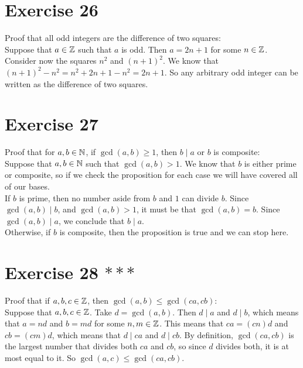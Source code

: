 \documentclass[12pt]{article}
\begin{document}
    \section*{Exercise 26}
    Proof that all odd integers are the difference of two squares: \\
    Suppose that $a \in \mathbb{Z}$
    such that $a$ is odd.
    Then $a = 2n+1$ for some $n \in \mathbb{Z}$.
    Consider now the squares $n^2$ and $(n+1)^2$.
    We know that $(n+1)^2 - n^2 = n^2 + 2n + 1 - n^2 = 2n+1$.
    So any arbitrary odd integer can be written
    as the difference of two squares. \\

    \section*{Exercise 27}
    Proof that for $a, b \in \mathbb{N}$,
    if $\gcd(a, b) \geqslant 1$,
    then $b \mid a$ or $b$ is composite: \\
    Suppose that $a, b \in \mathbb{N}$
    such that $\gcd(a, b) > 1$.
    We know that $b$ is either prime or composite,
    so if we check the proposition for each case
    we will have covered all of our bases. \\
    If $b$ is prime,
    then no number aside from $b$ and $1$ can divide $b$.
    Since $\gcd(a, b) \mid b$,
    and $\gcd(a, b) > 1$,
    it must be that $\gcd(a, b) = b$.
    Since $\gcd(a, b) \mid a$,
    we conclude that $b \mid a$. \\
    Otherwise, if $b$ is composite,
    then the proposition is true and we can stop here. \\

    \section*{Exercise 28 $***$}
    Proof that if $a, b, c \in \mathbb{Z}$,
    then $\gcd(a, b) \leqslant \gcd(ca, cb)$: \\
    Suppose that $a, b, c \in \mathbb{Z}$.
    Take $d = \gcd(a, b)$.
    Then $d \mid a$ and $d \mid b$,
    which means that $a = nd$ and $b = md$
    for some $n, m \in \mathbb{Z}$.
    This means that $ca = (cn)d$ and $cb = (cm)d$,
    which means that $d \mid ca$ and $d \mid cb$.
    By definition,
    $\gcd(ca, cb)$
    is the largest number that divides both $ca$ and $cb$,
    so since $d$ divides both,
    it is at most equal to it.
    So $\gcd(a, c) \leqslant \gcd(ca, cb)$. \\
\end{document}
